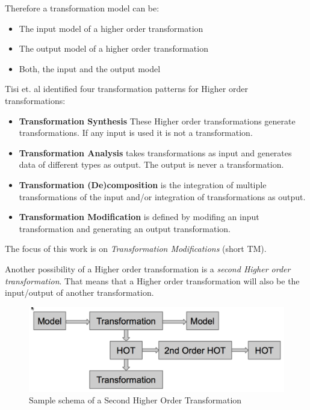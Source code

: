 \documentclass{llncs}
\begin{document}
Therefore a transformation model can be:

\begin{itemize}
	\item The input model of a higher order transformation
	\item The output model of a higher order transformation
	\item Both, the input and the output model
\end{itemize}

Tisi et. al \cite{Tisi:2009} identified four transformation patterns for Higher
order transformations:

\begin{itemize}
	\item \textbf{Transformation Synthesis} These Higher order transformations
	generate transformations. If any input is used it is not a transformation.
	\item \textbf{Transformation Analysis} takes transformations as input and generates data of different types as output. The output is never a transformation.
	\item \textbf{Transformation (De)composition} is the integration of multiple transformations of the input and/or integration of transformations as output.
	\item \textbf{Transformation Modification} is defined by modifing an input transformation and generating an output transformation.
\end{itemize}

The focus of this work is on \textit{Transformation Modifications} (short TM). 

Another possibility of a Higher order transformation is a \textit{second Higher
order transformation}. That means that a Higher order transformation will also be the
input/output of another transformation.

\begin{figure}
	\centering
	\includegraphics[width=1\textwidth,natwidth=610,natheight=642]{figures/SecondOrderHOT.pdf}
	\caption{Sample schema of a Second Higher Order
	Transformation}
	\label{fig:second_order}
\end{figure}
\end{document}
